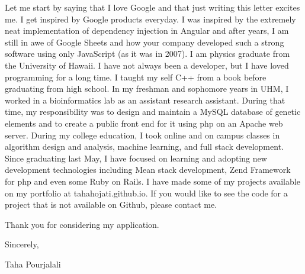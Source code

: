 \documentclass[11pt, a4paper]{awesome-cv}
\begin{document}
\begin{cvletter}
Let me start by saying that I love Google and that just writing this letter excites me.   I get inspired by Google products everyday.  I was inspired by the extremely neat implementation of dependency injection in Angular and after years, I am still in awe of Google Sheets and how your company developed such a strong software using only JavaScript (as it was in 2007). 
I am physics graduate from the University of Hawaii.  I have not always been a developer, but I have loved programming for a long time.  I taught my self C++ from a book before graduating from high school.  In my freshman and sophomore years in UHM, I worked in a bioinformatics lab as an assistant research assistant. During that time, my responsibility was to design and maintain a MySQL database of genetic elements and to create a public front end for it using php on an Apache web server.  During my college education, I took online and on campus classes in algorithm design and analysis, machine learning, and full stack development.  Since graduating last May, I have focused on learning and adopting new development technologies including Mean stack development, Zend Framework for php and even some Ruby on Rails.   I have made some of my projects available on my portfolio at tahahojati.github.io.  If you would like to see the code for a project that is not available on Github, please contact me.  

Thank you for considering my application.

Sincerely,

Taha Pourjalali

\end{cvletter}


\makeletterclosing
\end{document}
